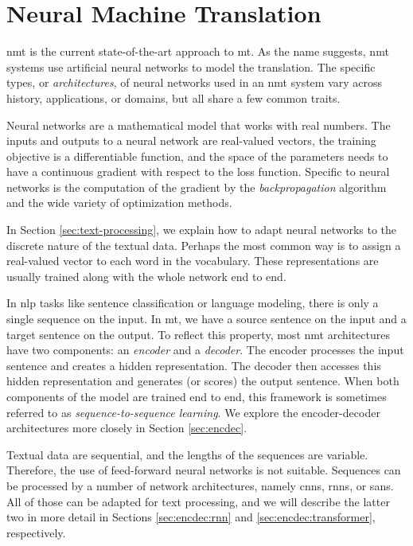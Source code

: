 \chapter{Neural Machine Translation}
\label{chap:nmt}

\Ac{nmt} is the current state-of-the-art approach to \ac{mt}. As the name
suggests, \ac{nmt} systems use artificial neural networks to model the
translation. The specific types, or \emph{architectures}, of neural networks
used in an \ac{nmt} system vary across history, applications, or domains, but
all share a few common traits.

Neural networks are a mathematical model that works with real numbers. The
inputs and outputs to a neural network are real-valued vectors, the training
objective is a differentiable function, and the space of the parameters needs
to have a continuous gradient with respect to the loss function. Specific to
neural networks is the computation of the gradient by the
\emph{backpropagation} algorithm and the wide variety of optimization methods.

In Section \ref{sec:text-processing}, we explain how to adapt neural networks
to the discrete nature of the textual data. Perhaps the most common way is to
assign a real-valued vector to each word in the vocabulary. These
representations are usually trained along with the whole network end to end.

In \acs{nlp} tasks like sentence classification or language modeling, there is
only a single sequence on the input. In \ac{mt}, we have a source sentence on
the input and a target sentence on the output. To reflect this property, most
\ac{nmt} architectures have two components: an \emph{encoder} and a
\emph{decoder}. The encoder processes the input sentence and creates a hidden
representation. The decoder then accesses this hidden representation and
generates (or scores) the output sentence. When both components of the model
are trained end to end, this framework is sometimes referred to as
\emph{sequence-to-sequence learning}. We explore the encoder-decoder
architectures more closely in Section \ref{sec:encdec}.

Textual data are sequential, and the lengths of the sequences are
variable. Therefore, the use of feed-forward neural networks is not
suitable. Sequences can be processed by a number of network architectures,
namely \acp{cnn}, \acp{rnn}, or \acp{san}. All of those can be adapted for text
processing, and we will describe the latter two in more detail in Sections
\ref{sec:encdec:rnn} and \ref{sec:encdec:transformer}, respectively.

